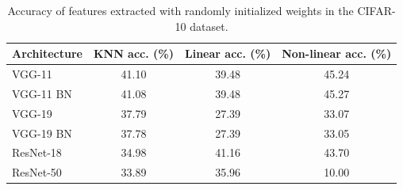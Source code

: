 \begin{table}[h!]
    \centering    
    \caption{\label{tab:feat_extr_results_randInit} Accuracy of features extracted with randomly initialized weights in the CIFAR-10 dataset.}      
    \begin{tabular}{lccc}
        \hline 
        {Architecture} & {KNN acc. (\%)} & {Linear acc. (\%)} & {Non-linear acc. (\%)}\tabularnewline
         \hline
        VGG-11 & 41.10 &   39.48 &   45.24 \tabularnewline
        VGG-11 BN & 41.08 &   39.48  &  45.27 \tabularnewline
        VGG-19 & 37.79 &   27.39 &   33.07 \tabularnewline
        VGG-19 BN & 37.78 &   27.39 &   33.05 \tabularnewline
        ResNet-18 & 34.98 &  41.16 &  43.70 \tabularnewline
        ResNet-50 & 33.89 &  35.96  &   10.00 \tabularnewline
        \hline
    \end{tabular} 
\end{table}

